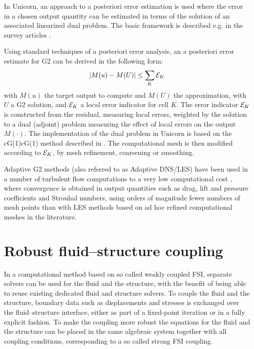 In Unicorn, an approach to a posteriori error estimation is used where the error in a chosen output quantity can be estimated in terms of the solution of an associated linearized dual problem. The basic framework is described e.g. in the survey articles \cite{ErikssonEstepEtAl1995,BeckerRannacher2001,GilesSuli2002}.

Using standard techniques of a posteriori error analysis, an a posteriori error estimate for G2 can be derived in the following form:
\begin{equation}
\vert M(u) - M(U) \vert \leq \sum_K {\cal E}_K
\end{equation}
with $M(u)$ the target output to compute and $M(U)$ the approximation, with $U$ a G2 solution, and ${\cal E}_K$ a local error indicator for cell $K$.
The error indicator ${\cal E}_K$ is constructed from the residual, measuring local errors,
weighted by the solution to a dual (adjoint) problem measuring the effect of local errors
on the output $M(\cdot)$. The implementation of the dual problem in Unicorn is based on the cG(1)cG(1) method described in \cite{HoffmanJohnson2007}. The computational mesh is then modified according to $ {\cal E}_K$, by mesh refinement, coarsening or smoothing.

Adaptive G2 methods (also referred to as Adaptive DNS/LES) have been used in a number of turbulent flow computations to a very low computational cost \cite{Hoffman2005,HoffmanJohnson2006b,Hoffman2006,Hoffman2009,HoffmanJansson2009,VilelaJanssonEtAl2010}, where convergence is obtained in output quantities such as drag, lift and pressure coefficients and Strouhal numbers, using orders of magnitude fewer numbers of mesh points than with LES methods based on ad hoc refined computational meshes in the literature.

\section{Robust fluid--structure coupling}

In a computational method based on so called weakly coupled FSI, separate solvers can be used for the fluid and the structure, with the benefit of being able to reuse existing dedicated fluid and structure solvers. To couple the fluid and the structure, boundary data such as displacements and stresses is exchanged over the fluid--structure interface, either as part of a fixed-point iteration or in a fully explicit fashion. To make the coupling more robust the equations for the fluid and the structure can be placed in the same algebraic system together with all coupling conditions, corresponding to a so called strong FSI coupling.

